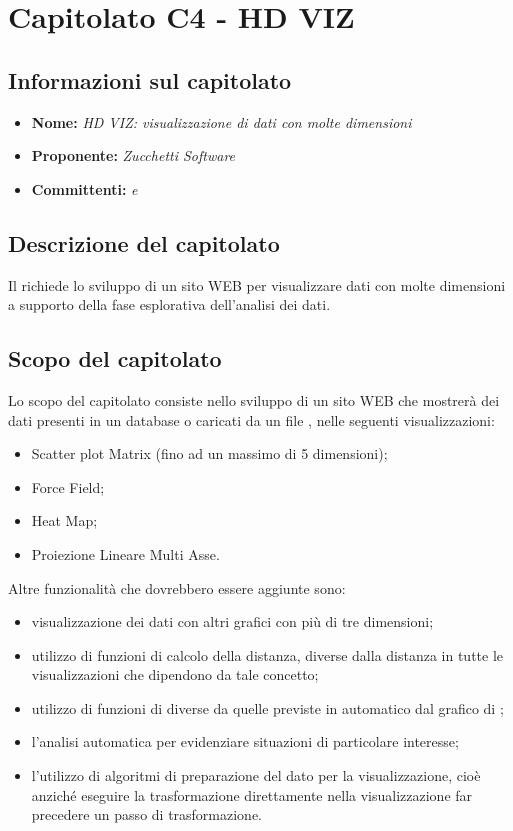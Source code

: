\section{Capitolato C4 - HD VIZ}
\subsection{Informazioni sul capitolato}
\begin{itemize}
	\item \textbf{Nome:} \textit{HD VIZ: visualizzazione di dati con molte dimensioni}
	\item \textbf{Proponente:} \textit{Zucchetti Software}
	\item \textbf{Committenti:} \textit{\VT{} e \CR{}}
\end{itemize}

\subsection{Descrizione del capitolato}
Il  richiede lo sviluppo di un sito WEB per visualizzare dati con molte dimensioni a supporto della fase esplorativa dell'analisi dei dati.

\subsection{Scopo del capitolato}
Lo scopo del capitolato consiste nello sviluppo di un sito WEB che mostrerà dei dati presenti in un database o caricati da un file , nelle seguenti visualizzazioni:
\begin{itemize}
	\item Scatter plot Matrix (fino ad un massimo di 5 dimensioni);
	\item Force Field;
	\item Heat Map;
	\item Proiezione Lineare Multi Asse.
\end{itemize}
Altre funzionalità che dovrebbero essere aggiunte sono:
\begin{itemize}
	\item visualizzazione dei dati con altri grafici con più di tre dimensioni;
	\item utilizzo di funzioni di calcolo della distanza, diverse dalla distanza  in tutte le visualizzazioni che dipendono da tale concetto;
	\item utilizzo di funzioni di  diverse da quelle previste in automatico dal grafico  di ;
	\item l'analisi automatica per evidenziare situazioni di particolare interesse;
	\item l'utilizzo di algoritmi di preparazione del dato per la visualizzazione, cioè anziché eseguire la trasformazione direttamente nella visualizzazione far precedere un passo di trasformazione.
\end{itemize}

